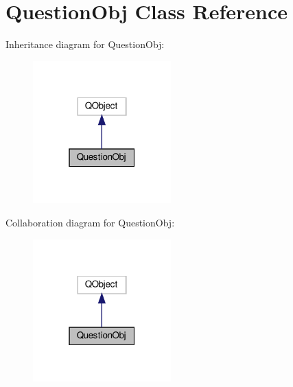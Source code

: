\hypertarget{classQuestionObj}{}\section{Question\+Obj Class Reference}
\label{classQuestionObj}


Inheritance diagram for Question\+Obj\+:
\nopagebreak
\begin{figure}[H]
\begin{center}
\leavevmode
\includegraphics[width=151pt]{classQuestionObj__inherit__graph}
\end{center}
\end{figure}


Collaboration diagram for Question\+Obj\+:
\nopagebreak
\begin{figure}[H]
\begin{center}
\leavevmode
\includegraphics[width=151pt]{classQuestionObj__coll__graph}
\end{center}
\end{figure}
